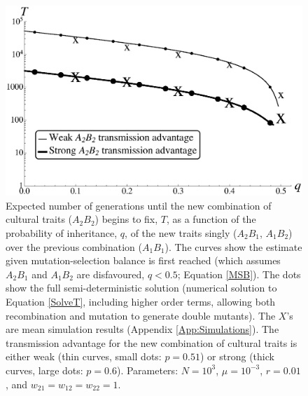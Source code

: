 \documentclass[review,3p,authoryear]{elsarticle}
\begin{document}
\begin{figure}[t]
\centering
\includegraphics[width=\linewidth]{IMAGES/TimeFixCultLogPSimsBW.eps}
\caption{
Expected number of generations until the new combination of cultural traits ($A_2B_2$) begins to fix, $T$, as a function of the probability of inheritance, $q$, of the new traits singly ($A_2B_1$, $A_1B_2$) over the previous combination ($A_1B_1$).
The curves show the estimate given mutation-selection balance is first reached (which assumes $A_2B_1$ and $A_1B_2$ are disfavoured, $q < 0.5$; Equation \ref{MSB}).
The dots show the full semi-deterministic solution (numerical solution to Equation \ref{SolveT}, including higher order terms, allowing both recombination and mutation to generate double mutants).
The $X$'s are mean simulation results (Appendix \ref{App:Simulations}).
The transmission advantage for the new combination of cultural traits is either weak (thin curves, small dots: $p=0.51$) or strong (thick curves, large dots: $p=0.6$).
Parameters: $N=10^{3}$, $\mu=10^{-3}$,  $r=0.01$, and $w_{21}=w_{12}=w_{22}=1$.
}
\label{TimeFixCult}
\end{figure}
\end{document}
